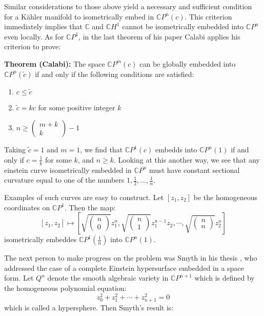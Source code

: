 \documentclass[11pt]{amsart}
\theoremstyle{definition}
\def \CP{ \mathbb{C}P }
\def \C{ \mathbb{C} }
\def \CH{ \mathbb{C}H }
\begin{document}
Similar considerations to those above yield a necessary and sufficient condition for a K\"{a}hler manifold to isometrically embed in $\CP^n(c)$.   This criterion immediately implies that $\C$ and $\CH^1$ cannot be isometrically embedded into $\CP^n$ even locally.  As for $\CP^1$, in the last theorem of his paper Calabi applies his criterion to prove:

{\bf Theorem (Calabi):} The space $\CP^{m}(c)$ can be globally embedded into $\CP^{n}(\tilde{c})$ if and only if the following conditions are satisfied:
\begin{enumerate}
\item $c \leq \tilde{c}$
\item $\tilde{c} = k c$ for some positive integer $k$
\item $ n \geq \left( \begin{array}{c} m + k \\ k \end{array} \right) - 1 $
\end{enumerate}

Taking $\tilde{c} = 1$ and $m = 1$, we find that $\CP^1(c)$ embedds into $\CP^n(1)$ if and only if $c = \frac{1}{k}$ for some $k$, and $n \geq k$.  Looking at this another way, we see that any einstein curve isometrically embedded in $\CP^{n}$ must have constant sectional curvature equal to one of the numbers $1, \frac{1}{2}, \ldots, \frac{1}{n}$.

Examples of such curves are easy to construct.  Let $[z_1, z_2]$ be the homogeneous coordinates on $\CP^1$.  Then the map:
%
$$ [z_1, z_2] \mapsto \left[ \sqrt{ \left( \begin{array}{c} n \\ 0 \end{array} \right) } z_1^n, \sqrt{ \left( \begin{array}{c} n \\ 1 \end{array} \right) } z_1^{n-1} z_2, \cdots, \sqrt{ \left( \begin{array}{c} n \\ n \end{array} \right) } z_2^n \right] $$ 
%
isometrically embeddes $\CP^1(\frac{1}{n})$ into $\CP^n(1)$.

The next person to make progress on the problem was Smyth in his thesis \cite{S}, who addressed the case of a complete Einstein hypersurface embedded in a space form.  Let $Q^{n}$ denote the smooth algebraic variety in $\CP^{n+1}$ which is defined by the homogeneous polynomial equation:
%
$$ z_0^2 + z_1^2 + \cdots + z_{n+1}^2 = 0 $$
%
which is called a hypersphere.  Then Smyth's result is:
\end{document}
